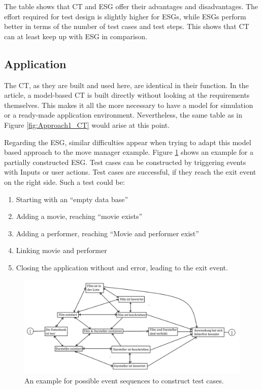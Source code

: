 The table shows that CT and ESG offer their advantages and disadvantages. The effort required for test design is slightly higher for ESGs, while ESGs perform better in terms of the number of test cases and test steps. This shows that CT can at least keep up with ESG in comparison.

\subsection{Application}

The CT, as they are built and used here, are identical in their function. In the article, a model-based CT is built directly without looking at the requirements themselves. This makes it all the more necessary to have a model for simulation or a ready-made application environment. Nevertheless, the same table as in Figure \ref{fig:Approach1_CT} would arise at this point.

Regarding the ESG, similar difficulties appear when trying to adapt this model based approach to the move manager example. Figure \ref{fig:ESG_example} shows an example for a partially constructed ESG. Test cases can be constructed by triggering events with Inputs or user actions. Test cases are successful, if they reach the exit event on the right side. Such a test could be: 

\begin{enumerate}
	\item Starting with an \enquote{empty data base}
	\item Adding a movie, reaching \enquote{movie exists}
	\item Adding a performer, reaching \enquote{Movie and performer exist}
	\item Linking movie and performer
	\item Closing the application without and error, leading to the exit event.
\end{enumerate}

\begin{figure}[H]
\centering
\includegraphics[scale=0.175]{../../individual/groeger/images/ESGamBeispiel.png} 
\caption{An example for possible event sequences to construct test cases.}
\label{fig:ESG_example}
\end{figure}

